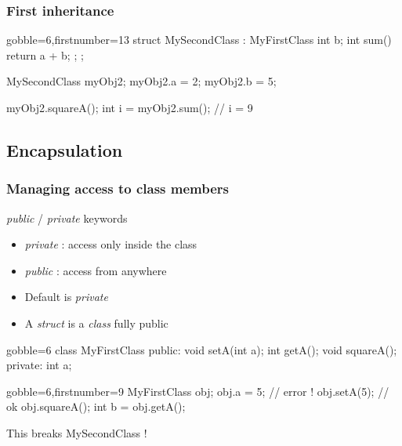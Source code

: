 \begin{frame}[fragile]
  \frametitle{First inheritance}
  \begin{multicols}{2}
    \begin{cppcode*}{gobble=6,firstnumber=13}
      struct MySecondClass :
        MyFirstClass {
        int b;
        int sum() {
          return a + b;
        };
      };

      MySecondClass myObj2;
      myObj2.a = 2;
      myObj2.b = 5;

      myObj2.squareA();
      int i = myObj2.sum();
      // i = 9
    \end{cppcode*}
    \columnbreak
    \center
    \null \vfill
    \vfill \null
  \end{multicols}
\end{frame}


\subsection{Encapsulation}

\begin{frame}[fragile]
  \frametitle{Managing access to class members}
  \begin{block}{{\it public} / {\it private} keywords}
    \begin{itemize}
      \item {\it private} : access only inside the class
      \item {\it public} : access from anywhere
      \item Default is {\it private}
      \item A {\it struct} is a {\it class} fully public
    \end{itemize}
  \end{block}
  \pause
  \begin{multicols}{2}
    \begin{cppcode*}{gobble=6}
      class MyFirstClass {
      public:
        void setA(int a);
        int getA();
        void squareA();
      private:
        int a;
      }
    \end{cppcode*}
    \columnbreak
    \begin{cppcode*}{gobble=6,firstnumber=9}
      MyFirstClass obj;
      obj.a = 5;   // error !
      obj.setA(5); // ok
      obj.squareA();
      int b = obj.getA();
    \end{cppcode*}
    \pause
    \begin{tcolorbox}[left=0mm,right=0mm,top=0mm,bottom=0mm,colback=red!5!white,colframe=red!75!black]
      This breaks MySecondClass !
    \end{tcolorbox}
  \end{multicols}
\end{frame}

